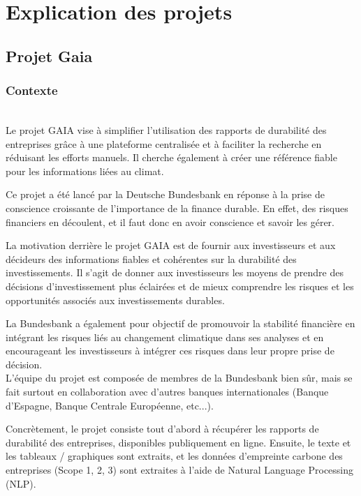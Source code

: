 \section{Explication des projets}


\subsection{Projet Gaia}

\subsubsection{Contexte}
~\\
Le projet GAIA vise à simplifier l'utilisation des rapports de durabilité des entreprises grâce à une plateforme centralisée et à faciliter la recherche en réduisant les efforts manuels. 
Il cherche également à créer une référence fiable pour les informations liées au climat.

Ce projet a été lancé par la Deutsche Bundesbank en réponse à la prise de conscience croissante de l'importance de la finance durable.
En effet, des risques financiers en découlent, et il faut donc en avoir conscience et savoir les gérer.

La motivation derrière le projet GAIA est de fournir aux investisseurs et aux décideurs des informations fiables et cohérentes sur la durabilité des investissements. 
Il s'agit de donner aux investisseurs les moyens de prendre des décisions d'investissement plus éclairées et de mieux comprendre les risques et les opportunités associés aux investissements durables.

La Bundesbank a également pour objectif de promouvoir la stabilité financière en intégrant les risques liés au changement climatique dans ses analyses et en encourageant les investisseurs à intégrer ces risques dans leur propre prise de décision.
\\
L'équipe du projet est composée de membres de la Bundesbank bien sûr, mais se fait surtout en collaboration avec d'autres banques internationales (Banque d'Espagne, Banque Centrale Européenne, etc...).

Concrètement, le projet consiste tout d'abord à récupérer les rapports de durabilité des entreprises, disponibles publiquement en ligne.
Ensuite, le texte et les tableaux / graphiques sont extraits, et les données d'empreinte carbone des entreprises (Scope 1, 2, 3) sont extraites à l'aide de Natural Language Processing (NLP).

